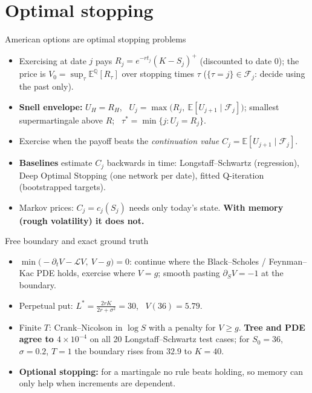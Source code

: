 
\section{Optimal stopping}

\begin{frame}{American options are optimal stopping problems}
\begin{itemize}
\item Exercising at date $j$ pays $R_j=e^{-rt_j}(K-S_j)^+$ (discounted to date 0); the price is
  $V_0=\sup_{\tau}\mathbb E^{\mathbb Q}[R_\tau]$ over stopping times $\tau$
  ($\{\tau=j\}\in\mathcal F_j$: decide using the past only).
\item \textbf{Snell envelope:} $U_H=R_H$, \ $U_j=\max\big(R_j,\ \mathbb E[U_{j+1}\mid\mathcal F_j]\big)$;
  smallest supermartingale above $R$; \ $\tau^*=\min\{j:U_j=R_j\}$.
\item Exercise when the payoff beats the \emph{continuation value} $C_j=\mathbb E[U_{j+1}\mid\mathcal F_j]$.
\item \textbf{Baselines} estimate $C_j$ backwards in time: Longstaff--Schwartz (regression),
  Deep Optimal Stopping (one network per date), fitted Q-iteration (bootstrapped targets).
\item Markov prices: $C_j=c_j(S_j)$ needs only today's state. \textbf{With memory (rough
  volatility) it does not.}
\end{itemize}
\end{frame}

\begin{frame}{Free boundary and exact ground truth}
\begin{itemize}
\item $\min\big(-\partial_tV-\mathcal LV,\ V-g\big)=0$: continue where the Black--Scholes /
  Feynman--Kac PDE holds, exercise where $V=g$; smooth pasting $\partial_SV=-1$ at the boundary.
\item Perpetual put: $L^*=\frac{2rK}{2r+\sigma^2}=30$, \ $V(36)=5.79$.
\item Finite $T$: Crank--Nicolson in $\log S$ with a penalty for $V\ge g$.
  \textbf{Tree and PDE agree to $4\times10^{-4}$} on all 20 Longstaff--Schwartz test cases;
  for $S_0=36$, $\sigma=0.2$, $T=1$ the boundary rises from $32.9$ to $K=40$.
\item \textbf{Optional stopping:} for a martingale no rule beats holding,
  so memory can only help when increments are dependent.
\end{itemize}
\end{frame}

